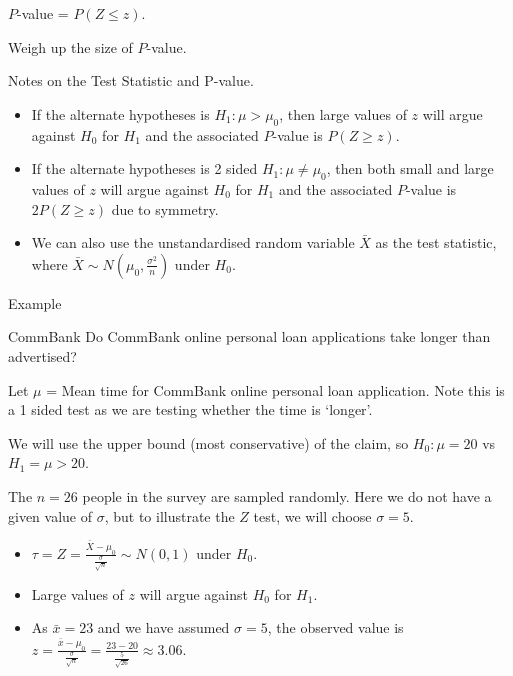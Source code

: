 \documentclass[t,xcolor=pdftex,dvipsnames,table]{beamer}\usepackage[]{graphicx}\usepackage[]{color}
\begin{document}
\begin{frame}[fragile]{}

 $P$-value = $P( Z \leq z)$.

\vspace{.5cm}
 Weigh up the size of $P$-value.

\vspace{.5cm}
Notes on the Test Statistic and P-value.

\begin{itemize}
\item If the alternate hypotheses is $H_{1}: \mu > \mu_{0}$, then large values of $z$ will argue against $H_{0}$ for $H_{1}$ and the associated $P$-value is $P( Z \geq z)$. 
\item If the alternate hypotheses is 2 sided $H_{1}: \mu \neq \mu_{0}$, then both small and large values of $z$ will argue against $H_{0}$ for $H_{1}$ and the associated $P$-value is $2P( Z \geq z)$ due to symmetry.
\item We can also use the unstandardised random variable $\bar{X}$ as the test statistic, where $\bar{X} \sim N(\mu_{0}, \frac {\sigma^2}{n})$ under $H_{0}$.
\end{itemize}

\end{frame}  

\begin{frame}[fragile]{Example}

\begin{block}{CommBank}
Do CommBank online personal loan applications take longer than advertised?
\end{block}

\vspace{.5cm}
Let $\mu$ = Mean time for CommBank online personal loan application. Note this is a 1 sided test as we are testing whether the time is `longer'.

\vspace{.5cm}
We will use the upper bound (most conservative) of the claim, so  
$H_{0}: \mu = 20$ vs $H_{1} = \mu > 20$.

\vspace{.5cm}
 The $n=26$ people in the  survey are sampled randomly. Here we do not have a given value of $\sigma$, but to illustrate the $Z$ test, we will choose $\sigma = 5$.
\end{frame}


\begin{frame}[fragile]{}

\begin{itemize}
\item $\tau = Z = \frac{\bar{X} - \mu_{0}}{\frac{\sigma}{\sqrt{n}}}  \sim N(0,1)$ under $H_{0}$. 
\item Large values of $z$ will argue against $H_{0}$ for $H_{1}$. 
\item As $\bar{x}=23$ and we have assumed $\sigma=5$, the observed value is $z=  \frac{\bar{x} - \mu_{0}}{\frac{\sigma}{\sqrt{n}}} = \frac{23 - 20}{\frac{5}{\sqrt{26}}} \approx 3.06$.
\end{itemize}



\end{frame}  
\end{document}
